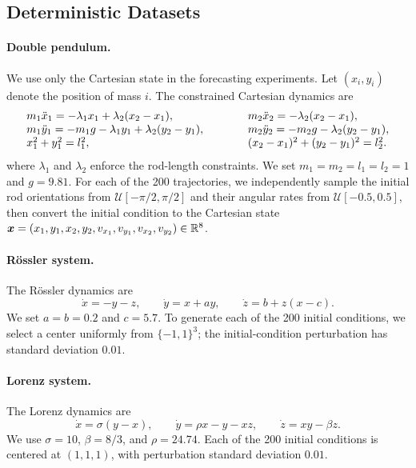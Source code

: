 \subsection{Deterministic Datasets}
\label{sec:deterministic-datasets}

\paragraph{Double pendulum.}
We use only the Cartesian state in the forecasting experiments.  Let
$(x_i,y_i)$ denote the position of mass $i$.  The constrained Cartesian
dynamics are
\[
\begin{array}{@{}l@{\qquad\qquad}l@{}}
  m_1\ddot{x}_1=-\lambda_1x_1+\lambda_2(x_2-x_1),
  &m_2\ddot{x}_2=-\lambda_2(x_2-x_1),\\
  m_1\ddot{y}_1=-m_1g-\lambda_1y_1+\lambda_2(y_2-y_1),
  &m_2\ddot{y}_2=-m_2g-\lambda_2(y_2-y_1),\\
  x_1^2+y_1^2=l_1^2,
  &(x_2-x_1)^2+(y_2-y_1)^2=l_2^2.
\end{array}
\]
where $\lambda_1$ and $\lambda_2$ enforce the rod-length constraints.  We set
$m_1=m_2=l_1=l_2=1$ and $g=9.81$.  For each of the 200 trajectories, we
independently sample the initial rod orientations from
$\mathcal U[-\pi/2,\pi/2]$ and their angular rates from
$\mathcal U[-0.5,0.5]$, then convert the initial condition to the Cartesian
state
${\bm{x}}=(x_1,y_1,x_2,y_2,v_{x_1},v_{y_1},v_{x_2},v_{y_2})\in\mathbb R^8$.

\paragraph{R\"ossler system.}
The R\"ossler dynamics are
\begin{equation}
  \dot{x}=-y-z,\qquad
  \dot{y}=x+ay,\qquad
  \dot{z}=b+z(x-c).
  \label{eq:rossler-dynamics}
\end{equation}
We set $a=b=0.2$ and $c=5.7$.  To generate each of the 200 initial
conditions, we select a center uniformly from
$\{-1,1\}^3$; the initial-condition perturbation has standard deviation
$0.01$.

\paragraph{Lorenz system.}
The Lorenz dynamics are
\begin{equation}
  \dot{x}=\sigma(y-x),\qquad
  \dot{y}=\rho x-y-xz,\qquad
  \dot{z}=xy-\beta z.
  \label{eq:lorenz-dynamics}
\end{equation}
We use $\sigma=10$, $\beta=8/3$, and $\rho=24.74$.  Each of the 200
initial conditions is centered at $(1,1,1)$, with perturbation standard
deviation $0.01$.

